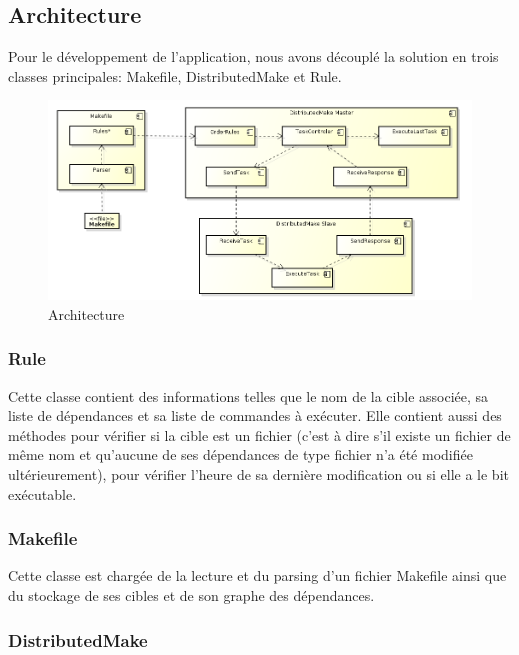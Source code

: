 \documentclass[a4paper,12pt,twoside]{article}
\begin{document}
\subsection{Architecture}

Pour le développement de l'application, nous avons découplé la solution en
trois classes principales: Makefile, DistributedMake et Rule.

\begin{figure}[H]
  \centering
  \includegraphics[scale=0.4]{schema.png}
  \caption{Architecture}
  \label{fig:architecture}
\end{figure}

\subsubsection{Rule}

Cette classe contient des informations telles que le nom de la cible
associée, sa liste de dépendances et sa liste de commandes à
exécuter. Elle contient aussi des méthodes pour vérifier si la cible
est un fichier (c'est à dire s'il existe un fichier de même nom et
qu'aucune de ses dépendances de type fichier n'a été modifiée
ultérieurement), pour vérifier l'heure de sa dernière modification ou
si elle a le bit exécutable.

\subsubsection{Makefile}

Cette classe est chargée de la lecture et du parsing d'un fichier
Makefile ainsi que du stockage de ses cibles et de son graphe des dépendances.

\subsubsection{DistributedMake}
\end{document}

